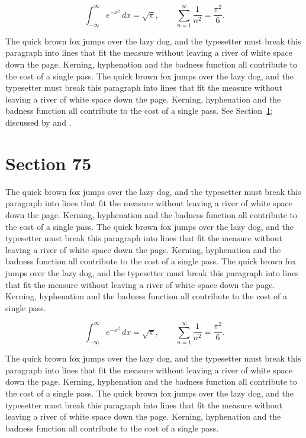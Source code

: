 \documentclass{article}
\begin{document}
\begin{equation}\label{eq:74}
\int_{-\infty}^{\infty} e^{-x^{2}}\,dx = \sqrt{\pi}, \qquad
\sum_{n=1}^{\infty} \frac{1}{n^{2}} = \frac{\pi^{2}}{6}.
\end{equation}

The quick brown fox jumps over the lazy dog, and the typesetter must break this paragraph into lines that fit the measure without leaving a river of white space down the page. Kerning, hyphenation and the badness function all contribute to the cost of a single pass. The quick brown fox jumps over the lazy dog, and the typesetter must break this paragraph into lines that fit the measure without leaving a river of white space down the page. Kerning, hyphenation and the badness function all contribute to the cost of a single pass. 
See Section~\ref{sec:75}; discussed by \textcite{k5} and \textcite{l2}.
\section{Section 75}
\label{sec:75}
The quick brown fox jumps over the lazy dog, and the typesetter must break this paragraph into lines that fit the measure without leaving a river of white space down the page. Kerning, hyphenation and the badness function all contribute to the cost of a single pass. The quick brown fox jumps over the lazy dog, and the typesetter must break this paragraph into lines that fit the measure without leaving a river of white space down the page. Kerning, hyphenation and the badness function all contribute to the cost of a single pass. The quick brown fox jumps over the lazy dog, and the typesetter must break this paragraph into lines that fit the measure without leaving a river of white space down the page. Kerning, hyphenation and the badness function all contribute to the cost of a single pass. 

\begin{equation}\label{eq:75}
\int_{-\infty}^{\infty} e^{-x^{2}}\,dx = \sqrt{\pi}, \qquad
\sum_{n=1}^{\infty} \frac{1}{n^{2}} = \frac{\pi^{2}}{6}.
\end{equation}

The quick brown fox jumps over the lazy dog, and the typesetter must break this paragraph into lines that fit the measure without leaving a river of white space down the page. Kerning, hyphenation and the badness function all contribute to the cost of a single pass. The quick brown fox jumps over the lazy dog, and the typesetter must break this paragraph into lines that fit the measure without leaving a river of white space down the page. Kerning, hyphenation and the badness function all contribute to the cost of a single pass. 
\end{document}
